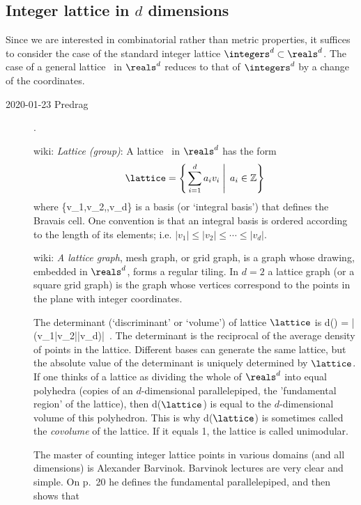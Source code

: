 \subsection{Integer lattice in $d$ dimensions}

Since we are interested in combinatorial rather than metric properties,
it suffices to consider the case of the standard integer lattice
$\integers^d\subset\reals^d$. The case of a general lattice \lattice\ in
$\reals^d$ reduces to that of $\integers^d$ by a change of the
coordinates.

\begin{description}

\item[2020-01-23 Predrag].

 {wiki}:
{\em Lattice (group)}:
A lattice \lattice\ in \(\reals^d\)
has the form
\[
\lattice = \left\{\left. \sum_{i=1}^d a_i v_i \; \right\vert \; a_i \in\mathbb{Z} \right\}
\]
where
\beq
\{v_1,v_2,\cdots,v_d\}
is a basis (or `integral basis') that defines the Bravais cell.
One convention is that an integral basis is ordered according to the
length of its elements; i.e. $|v_1|\leq|v_2|\leq\cdots\leq|v_d|$.

 {wiki}:
{\em A lattice graph},
mesh graph, or grid graph, is a graph whose drawing, embedded in
 $\reals^d$, forms a regular tiling.
In $d=2$ a lattice graph (or a square grid graph)
is the graph whose vertices correspond to the points in the plane with
integer coordinates.

The determinant (`discriminant' or `volume') of lattice $\lattice$ is
\beq
d(\lattice) = |\det(v_1|v_2|\cdots|v_d)|
\,.
The determinant is the reciprocal of the average density of points in the
lattice.
Different bases can generate the same lattice,
but the absolute value of the determinant
is uniquely determined by $\lattice$.
If one thinks of a lattice as dividing the whole of
\(\reals^d\) into equal polyhedra (copies of
an $d$-dimensional parallelepiped, the 'fundamental
region' of the lattice), then d($\lattice$) is equal to the $d$-dimensional
volume of this polyhedron.  This is why d($\lattice$) is sometimes called the
\emph{covolume} of the lattice.  If it equals 1, the lattice is called
unimodular.

The master of counting integer lattice points in various domains (and all
dimensions) is Alexander 
{Barvinok}.
Barvinok 
{lectures} are very clear and simple. On p.~20 he defines the fundamental
parallelepiped, and then shows that


\end{description}
